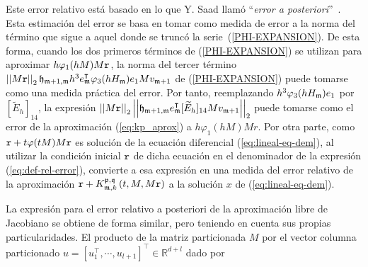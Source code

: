 Este error relativo está basado en lo que Y. Saad llamó ``\textit{error a posteriori}''~\cite{Saad92}. Esta estimación del error se basa en tomar como medida 
de error a la norma del término que sigue a aquel donde se truncó la serie~(\ref{PHI-EXPANSION}). De esta forma, cuando los dos primeros términos de (\ref{PHI-EXPANSION}) se utilizan para aproximar $h\varphi_1(hM)M\mathtt{r}$, la norma del tercer término $\left\lvert\left\lvert M\mathtt{r} \right\rvert\right\rvert_2 \mathfrak{h}_{\mathfrak{m}+1,\mathfrak{m}} h^{3} e_{\mathfrak{m}}^\intercal\varphi_3( h H_{\mathfrak{m}})e_1 M v_{\mathfrak{m}+1} $ de (\ref{PHI-EXPANSION}) puede tomarse como una medida práctica del error. Por tanto, reemplazando $h^3\varphi_3( h H_{\mathfrak{m}})e_1$ por $[\widetilde{E}_{h}]_{14}$, la expresión $\left\lvert \left\lvert M\mathtt{r} \right\rvert\right\rvert_2 \left\lvert\left\lvert \mathfrak{h}_{\mathfrak{m}+1,\mathfrak{m}} e_{\mathfrak{m}}^\intercal[\widetilde{E}_{h}]_{14} M v_{\mathfrak{m}+1} \right\rvert\right\rvert_2$ puede tomarse como el error de la aproximación (\ref{eq:kp_aprox}) a $h\varphi_1(h M)Mr$. Por otra parte, como $\mathtt{r}+t\varphi(tM)M\mathtt{r}$ es solución de la ecuación diferencial (\ref{eq:lineal-eq-dem}), al utilizar la condición inicial $\mathtt{r}$ de dicha ecuación en el denominador de la expresión (\ref{eq:def-rel-error}), convierte a esa expresión en una medida del error relativo de la aproximación $\mathtt{r}+ K_{\mathfrak{m},k}^{\mathfrak{p},\mathfrak{q}}\left(t, M, M\mathtt{r} \right)$ a la solución $x$ de (\ref{eq:lineal-eq-dem}).  

La expresión para el error relativo a posteriori de la aproximación libre de Jacobiano se obtiene de forma similar, pero teniendo en cuenta sus propias particularidades. El producto de la matriz particionada $M$ por el vector columna particionado $u=[u_1^\intercal,\cdots , u_{l+1}]^\intercal \in \mathbb{R}^{d+l}$ dado por

